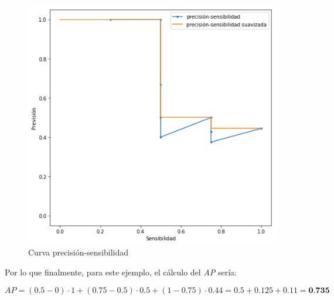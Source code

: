 \begin{figure}[H]
	\centering
	\includegraphics[width=0.7\linewidth]{images/ap_precision_recall_curve.png}
	\caption{Curva precisión-sensibilidad}
	\label{fig:apprecisionrecallcurve}
\end{figure}

Por lo que finalmente, para este ejemplo, el cálculo del \textit{AP} sería:

\begin{equation}
	AP = (0.5 - 0) \cdot 1 + (0.75 - 0.5) \cdot 0.5 + (1 - 0.75) \cdot 0.44 = 0.5 + 0.125 + 0.11 = \textbf{0.735}
	\nonumber
\end{equation}